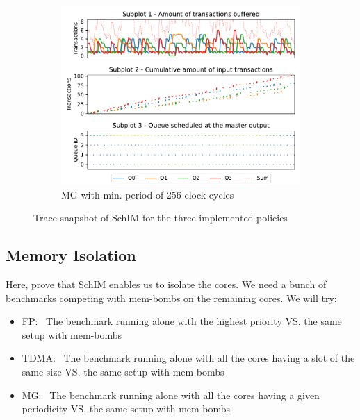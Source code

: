 \begin{figure}[!ht]
\begin{subfigure}{0.5\textwidth}
      \end{subfigure}
      \vfill
      \begin{subfigure}{0.5\textwidth}
        \centering
        \includegraphics[scale=0.55]{images/SchIM_MG_buffering.pdf}
        \caption{MG with min. period of 256 clock cycles}
        \label{fig:schim_behaviour_mg}
      \end{subfigure}
      \caption{Trace snapshot of SchIM for the three implemented policies}
      \label{fig:schim_behaviour}
    \end{figure}

  \subsection{Memory Isolation}
    Here, prove that SchIM enables us to isolate the cores. We need a bunch of benchmarks competing with mem-bombs on the remaining cores. We will try:
    \begin{itemize}
      \item FP:~ The benchmark running alone with the highest priority VS. the same setup with mem-bombs
      \item TDMA:~ The benchmark running alone with all the cores having a slot of the same size VS. the same setup with mem-bombs
      \item MG:~ The benchmark running alone with all the cores having a given periodicity VS. the same setup with mem-bombs
    \end{itemize}
